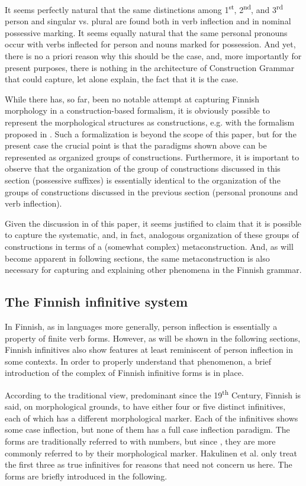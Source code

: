 \documentclass[output=paper, colorlinks,citecolor=brown]{langsci/langscibook}
\begin{document}
It seems perfectly natural that the same distinctions among  1\textsuperscript{st}, 2\textsuperscript{nd}, and 3\textsuperscript{rd} person and singular vs. plural are found both in verb inflection and in nominal possessive marking. It seems equally natural that the same personal pronouns occur with verbs inflected for person and nouns marked for possession. And yet, there is no a priori reason why this should be the case, and, more importantly for present purposes, there is nothing in the architecture of Construction Grammar that could capture, let alone explain, the fact that it is the case.

While there has, so far, been no notable attempt at capturing Finnish morphology in a construction-based formalism, it is obviously possible to represent the morphological structures as constructions, e.g. with the formalism proposed in \citet{Booij2010}. Such a formalization is beyond the scope of this paper, but for the present case the crucial point is that the paradigms shown above can be represented as organized groups of constructions. Furthermore, it is important to observe that the organization of the group of constructions discussed in this section (possessive suffixes) is essentially identical to the organization of the groups of constructions discussed in the previous section (personal pronouns and verb inflection).

Given the discussion in  of this paper, it seems justified to claim that it is possible to capture the systematic, and, in fact, analogous organization of these groups of constructions in terms of a (somewhat complex) metaconstruction. And, as will become apparent in following sections, the same metaconstruction is also necessary for capturing and explaining other phenomena in the Finnish grammar.

\subsection{The Finnish infinitive system}\label{sec:leino_4.3}\largerpage

In Finnish, as in languages more generally, person inflection is essentially a property of finite verb forms. However, as will be shown in the following sections, Finnish infinitives also show features at least reminiscent of person inflection in some contexts. In order to properly understand that phenomenon, a brief introduction of the complex of Finnish infinitive forms is in place.

According to the traditional view, predominant since the 19\textsuperscript{th} Century, Finnish is said, on morphological grounds, to have either four or five distinct infinitives, each of which has a different morphological marker. Each of the infinitives shows some case inflection, but none of them has a full case inflection paradigm. The forms are traditionally referred to with numbers, but since \citet{HakulinenEtAl2004}, they are more commonly referred to by their morphological marker. Hakulinen et al. only treat the first three as true infinitives for reasons that need not concern us here. The forms are briefly introduced in the following.
\end{document}
